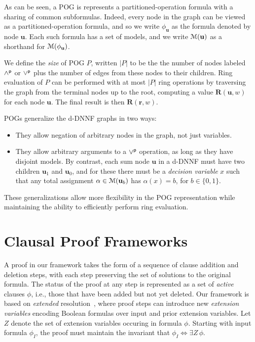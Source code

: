 \documentclass[letterpaper,USenglish,cleveref, autoref, thm-restate]{lipics-v2021}
\newcommand{\pand}{\mathbin{\land^{\sf p}}}
\newcommand{\por}{\mathbin{\lor^{\sf p}}}
\newcommand{\rep}{\textbf{R}}
\newcommand{\ifandonlyif}{\Leftrightarrow}
\newcommand{\assign}{\alpha}
\newcommand{\modelset}{{\cal M}}
\newcommand{\inputformula}{\phi_I}
\newcommand{\makenode}[1]{\mathbf{#1}}
\newcommand{\nodeu}{\makenode{u}}
\newcommand{\noder}{\makenode{r}}
\begin{document}
As can be seen, a POG is represents a partitioned-operation
formula with a sharing of common subformulas.  Indeed, every node in the graph can be viewed as a partitioned-operation formula, and so we write
$\phi_{\nodeu}$ as the formula denoted by node $\nodeu$.
Each such formula has a set of models, and we write $\modelset(\nodeu)$ as a shorthand for $\modelset(\phi_{\nodeu})$.

We define the {\em size} of POG $P$, written $|P|$ to be the
the number of nodes labeled $\pand$ or $\por$ plus the number of edges from these nodes to their children.  Ring
evaluation of $P$ can be performed with at most $|P|$ ring
operations by traversing the graph from the terminal nodes up to
the root, computing a value $\rep(\nodeu, w)$ for each node $\nodeu$.
The final result is then $\rep(\noder, w)$.

POGs generalize the d-DNNF graphs in two ways:
\begin{itemize}
\item They allow negation of arbitrary nodes in the graph, not just
  variables.
\item They allow arbitrary arguments to a $\por$ operation, as long as
  they have disjoint models.  By contrast, each
  sum node $\nodeu$ in a d-DNNF must have two children $\nodeu_1$ and $\nodeu_0$, and for these there must be a {\em decision variable} $x$ such that
  any total assignment $\assign \in  \modelset(\nodeu_b)$ has $\assign(x)=b$, for $b \in \{0,1\}$.
\end{itemize}
  These generalizations allow more flexibility in the POG
  representation while maintaining the ability to efficiently perform ring evaluation.

\section{Clausal Proof Frameworks}

A proof in our framework takes the form of a sequence of clause addition
and deletion steps, with each step preserving the set of solutions to
the original formula.
The status of the proof at any step is represented as
a set of {\em active} clauses $\phi$, i.e., those that
have been added but not yet deleted.
Our framework is based
on {\em extended} resolution~\cite{Tseitin:1983}, where proof
steps can introduce new {\em extension variables} encoding Boolean formulas over input and prior extension variables.
Let $Z$
denote the set of extension variables occuring in formula $\phi$.
Starting with input formula $\inputformula$,
the proof must maintain the invariant that
$\inputformula \ifandonlyif \exists Z\,\phi$.
\end{document}
